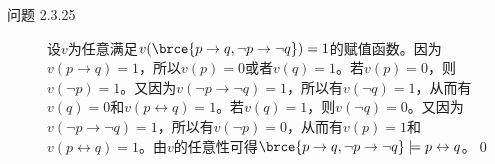 \documentclass[punct=custom/kaiming,fontset=none]{ctexart}
\begin{document}
\begin{description}
\begin{enumerate}
  \end{enumerate}
\item[问题 2.3.25] 设\(v\)为任意满足\(v(\brce{p \to q, \neg p \to \neg q}) = 1\)的赋值函数。因为\(v(p \to q) = 1\)，所以\(v(p) = 0\)或者\(v(q) = 1\)。若\(v(p) = 0\)，则\(v(\neg p) = 1\)。又因为\(v(\neg p \to \neg q) = 1\)，所以有\(v(\neg q) = 1\)，从而有\(v(q) = 0\)和\(v(p \leftrightarrow q) = 1\)。若\(v(q) = 1\)，则\(v(\neg q) = 0\)。又因为\(v(\neg p \to \neg q) = 1\)，所以有\(v(\neg p) = 0\)，从而有\(v(p) = 1\)和\(v(p \leftrightarrow q) = 1\)。由\(v\)的任意性可得\(\brce{p \to q, \neg p \to \neg q} \models p \leftrightarrow q\)。\qed
\end{description}
\end{document}
